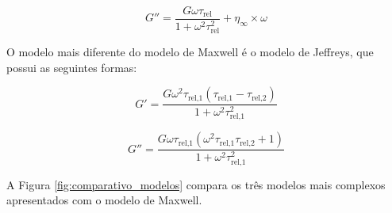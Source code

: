 			\begin{equation}
				G'' =\dfrac{  G \omega  \tau_{\textrm{rel}}        }{ 1 + \omega^2 \tau_{\textrm{rel}}^2 } + \eta_{\infty} \times \omega
				\label{eqn:modelo_oldroyd_g2}
			\end{equation}
			
			O modelo mais diferente do modelo de Maxwell é o modelo de Jeffreys, que possui as seguintes formas: 
			
			\begin{equation}
				G' = \dfrac{G \omega^{2} \tau_{\textrm{rel,1}} \left(\tau_{\textrm{rel,1}} - \tau_{\textrm{rel,2}}\right)}{1 + \omega^{2} \tau_{\textrm{rel,1}}^{2}}
				\label{eqn:modelo_jeffreys_g1}
			\end{equation}
			
			\begin{equation}
				G'' = \dfrac{G \omega \tau_{\textrm{rel,1}} \left(\omega^{2} \tau_{\textrm{rel,1}} \tau_{\textrm{rel,2}} + 1\right)}{1 + \omega^{2} \tau_{\textrm{rel,1}}^{2}}
				\label{eqn:modelo_jeffreys_g2}
			\end{equation}
			
			
			A Figura \ref{fig:comparativo_modelos} compara os três modelos mais complexos apresentados com o modelo de Maxwell. 
			
